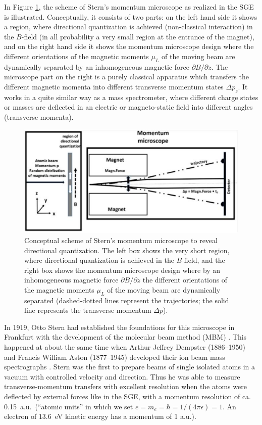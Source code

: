 \documentclass[12pt]{article}
\begin{document}
In Figure \ref{fig:SGEscheme}, the scheme of Stern's momentum microscope as realized in the SGE is illustrated. Conceptually, it consists of two parts: on the left hand side it shows a region, where directional quantization is achieved (non-classical interaction) in the $B$-field (in all probability a very small region at the entrance of the magnet), and on the right hand side it shows the momentum microscope design where the different orientations of the magnetic moments $\mu_L$ of the moving beam are dynamically separated by an inhomogeneous magnetic force $\partial B/\partial z$. The microscope part on the right is a purely classical apparatus which transfers the different magnetic momenta into different transverse momentum states $\Delta p_z$. It works in a quite similar way as a mass spectrometer, where different charge states or masses are deflected in an electric or magneto-static field into different angles (transverse momenta). 
%
\begin{figure}
\begin{center}
\includegraphics[scale=0.5]{figures/SGE_scheme}
\caption{Conceptual scheme of Stern's momentum microscope to reveal directional quantization. The left box shows the very short region, where directional quantization is achieved in the $B$-field, and the right box shows the momentum microscope design where by an inhomogeneous magnetic force $\partial B/\partial z$ the different orientations of the magnetic moments $\mu_L$ of the moving beam are dynamically separated (dashed-dotted lines represent the trajectories; the solid line represents the transverse momentum $\Delta p$).}
\label{fig:SGEscheme}
\end{center}
\end{figure}

In 1919, Otto Stern had established the foundations for this microscope in Frankfurt with the development of the molecular beam method (MBM) \citep{SternO1920Messung}. This happened at about the same time when Arthur Jeffrey Dempster (1886--1950) and Francis William Aston (1877--1945) developed their ion beam mass spectrographs \citep{DempsterAJ1918Method,AstonF1919Spectrograph}. Stern was the first to prepare beams of single isolated atoms in a vacuum with controlled velocity and direction. Thus he was able to measure transverse-momentum transfers with excellent resolution when the atoms were deflected by external forces like in the SGE, with a momentum resolution of ca. 0.15~a.u.\ (``atomic units'' in which we set $e=m_e=\hbar=1/(4\pi\epsilon)=1$. An electron of $13.6$~eV kinetic energy has a momentum of 1 a.u.). 
 
\end{document}
